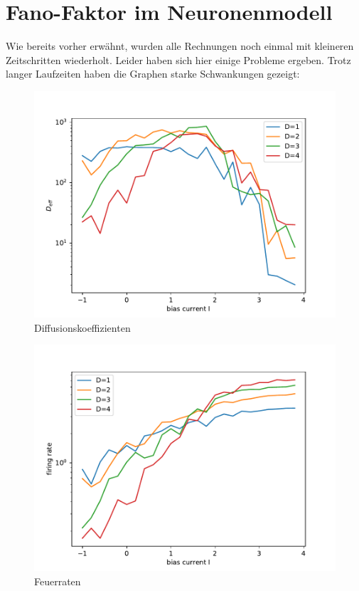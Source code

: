 \documentclass[12pt,a4paper]{article}
\begin{document}
\section{Fano-Faktor im Neuronenmodell}
Wie bereits vorher erwähnt, wurden alle Rechnungen noch einmal mit kleineren Zeitschritten wiederholt. Leider haben sich hier einige Probleme ergeben. Trotz langer Laufzeiten haben die Graphen starke Schwankungen gezeigt:
\begin{figure}[H]
	\centering
	\includegraphics[scale=0.9]{dneurs.pdf} 
	\caption{Diffusionskoeffizienten}
	\label{dnc}
\end{figure} 
\begin{figure}[H]
	\centering
	\includegraphics[scale=0.9]{gneurs.pdf} 
	\caption{Feuerraten}
	\label{gnc}
\end{figure} 
\end{document}
